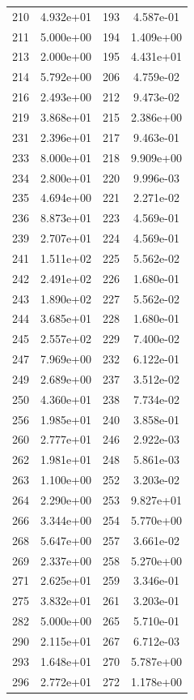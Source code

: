 \documentclass[12pt]{article}
\begin{document}
\begin{longtable}{@{}cccc@{}}
210 & 4.932e+01 & 193 & 4.587e-01 \\
211 & 5.000e+00 & 194 & 1.409e+00 \\
213 & 2.000e+00 & 195 & 4.431e+01 \\
214 & 5.792e+00 & 206 & 4.759e-02 \\
216 & 2.493e+00 & 212 & 9.473e-02 \\
219 & 3.868e+01 & 215 & 2.386e+00 \\
231 & 2.396e+01 & 217 & 9.463e-01 \\
233 & 8.000e+01 & 218 & 9.909e+00 \\
234 & 2.800e+01 & 220 & 9.996e-03 \\
235 & 4.694e+00 & 221 & 2.271e-02 \\
236 & 8.873e+01 & 223 & 4.569e-01 \\
239 & 2.707e+01 & 224 & 4.569e-01 \\
241 & 1.511e+02 & 225 & 5.562e-02 \\
242 & 2.491e+02 & 226 & 1.680e-01 \\
243 & 1.890e+02 & 227 & 5.562e-02 \\
244 & 3.685e+01 & 228 & 1.680e-01 \\
245 & 2.557e+02 & 229 & 7.400e-02 \\
247 & 7.969e+00 & 232 & 6.122e-01 \\
249 & 2.689e+00 & 237 & 3.512e-02 \\
250 & 4.360e+01 & 238 & 7.734e-02 \\
256 & 1.985e+01 & 240 & 3.858e-01 \\
260 & 2.777e+01 & 246 & 2.922e-03 \\
262 & 1.981e+01 & 248 & 5.861e-03 \\
263 & 1.100e+00 & 252 & 3.203e-02 \\
264 & 2.290e+00 & 253 & 9.827e+01 \\
266 & 3.344e+00 & 254 & 5.770e+00 \\
268 & 5.647e+00 & 257 & 3.661e-02 \\
269 & 2.337e+00 & 258 & 5.270e+00 \\
271 & 2.625e+01 & 259 & 3.346e-01 \\
275 & 3.832e+01 & 261 & 3.203e-01 \\
282 & 5.000e+00 & 265 & 5.710e-01 \\
290 & 2.115e+01 & 267 & 6.712e-03 \\
293 & 1.648e+01 & 270 & 5.787e+00 \\
296 & 2.772e+01 & 272 & 1.178e+00 \\

\end{longtable}
\end{document}
